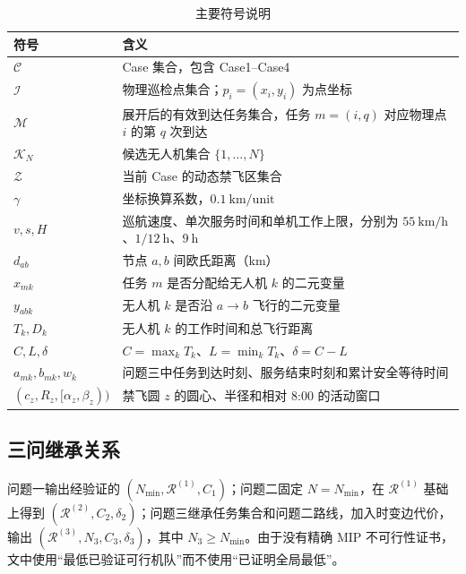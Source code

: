 \begin{table}[H]
\centering
\small
\caption{主要符号说明}
\label{tab:symbols}
\begin{tabular}{p{}p{}}
\toprule
符号 & 含义 \\
\midrule
$\mathcal C$ & Case 集合，包含 Case1--Case4 \\
$\mathcal I$ & 物理巡检点集合；$p_i=(x_i,y_i)$ 为点坐标 \\
$\mathcal M$ & 展开后的有效到达任务集合，任务 $m=(i,q)$ 对应物理点 $i$ 的第 $q$ 次到达 \\
$\mathcal K_N$ & 候选无人机集合 $\{1,\ldots,N\}$ \\
$\mathcal Z$ & 当前 Case 的动态禁飞区集合 \\
$\gamma$ & 坐标换算系数，$0.1\ \mathrm{km/unit}$ \\
$v,s,H$ & 巡航速度、单次服务时间和单机工作上限，分别为 $55\ \mathrm{km/h}$、$1/12\ \mathrm{h}$、$9\ \mathrm{h}$ \\
$d_{ab}$ & 节点 $a,b$ 间欧氏距离（km） \\
$x_{mk}$ & 任务 $m$ 是否分配给无人机 $k$ 的二元变量 \\
$y_{abk}$ & 无人机 $k$ 是否沿 $a\to b$ 飞行的二元变量 \\
$T_k,D_k$ & 无人机 $k$ 的工作时间和总飞行距离 \\
$C,L,\delta$ & $C=\max_kT_k$、$L=\min_kT_k$、$\delta=C-L$ \\
$a_{mk},b_{mk},w_k$ & 问题三中任务到达时刻、服务结束时刻和累计安全等待时间 \\
$(c_z,R_z,[\alpha_z,\beta_z))$ & 禁飞圆 $z$ 的圆心、半径和相对 8:00 的活动窗口 \\
\bottomrule
\end{tabular}
\end{table}

\subsection{三问继承关系}

问题一输出经验证的 $(N_{\min},\mathcal R^{(1)},C_1)$；问题二固定 $N=N_{\min}$，在 $\mathcal R^{(1)}$ 基础上得到 $(\mathcal R^{(2)},C_2,\delta_2)$；问题三继承任务集合和问题二路线，加入时变边代价，输出 $(\mathcal R^{(3)},N_3,C_3,\delta_3)$，其中 $N_3\geq N_{\min}$。由于没有精确 MIP 不可行性证书，文中使用“最低已验证可行机队”而不使用“已证明全局最低”。
